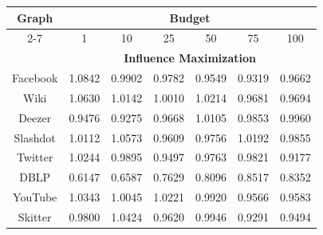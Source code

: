 \documentclass[letterpaper]{article} %
\begin{document}
\begin{table}[h!]
              \centering
                \begin{tabular}{|c|c|c|c|c|c|c|}
                \hline
                \multirow{2}[4]{*}{\textbf{Graph}} & 
                    \multicolumn{6}{|c|}{\textbf{Budget}} \\
                    \cline{2-7} & 1 & 10 & 25 & 50 & 75 & 100 \\
                \hline
& \multicolumn{6}{c|}{\textbf{Influence Maximization}} \\ \hline
Facebook& 1.0842 & 0.9902 & 0.9782 & 0.9549 & 0.9319 & 0.9662 \\
Wiki& 1.0630 & 1.0142 & 1.0010 & 1.0214 & 0.9681 & 0.9694 \\
Deezer& 0.9476 & 0.9275 & 0.9668 & 1.0105 & 0.9853 & 0.9960 \\
Slashdot& 1.0112 & 1.0573 & 0.9609 & 0.9756 & 1.0192 & 0.9855 \\
Twitter& 1.0244 & 0.9895 & 0.9497 & 0.9763 & 0.9821 & 0.9177 \\
DBLP& 0.6147 & 0.6587 & 0.7629 & 0.8096 & 0.8517 & 0.8352 \\
YouTube& 1.0343 & 1.0045 & 1.0221 & 0.9920 & 0.9566 & 0.9583 \\
Skitter& 0.9800 & 1.0424 & 0.9620 & 0.9946 & 0.9291 & 0.9494 \\
 \hline


\end{tabular}
\end{table}
\end{document}
